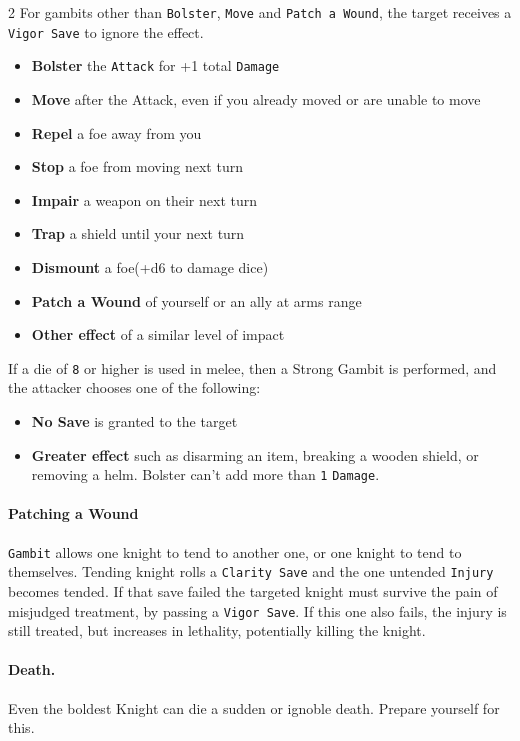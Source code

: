 \documentclass{osr-template/zine}
\begin{document}
\begin{multicols*}{2}
For gambits other than \texttt{Bolster}, \texttt{Move} and \texttt{Patch a Wound}, the target receives a \texttt{Vigor Save} to ignore the effect.

\begin{itemize}[nosep]
    \item \textbf{Bolster} the \texttt{Attack} for +1 total \texttt{Damage}
    \item \textbf{Move} after the Attack, even if you already moved or are unable to move
    \item \textbf{Repel} a foe away from you
    \item \textbf{Stop} a foe from moving next turn
    \item \textbf{Impair} a weapon on their next turn
    \item \textbf{Trap} a shield until your next turn
    \item \textbf{Dismount} a foe(+d6 to damage dice)
    \item \textbf{Patch a Wound} of yourself or an ally at arms range
    \item \textbf{Other effect} of a similar level of impact
\end{itemize}

If a die of \texttt{8} or higher is used in melee, then a Strong Gambit is performed, and the attacker chooses one of the following:

\begin{itemize}[nosep]
    \item \textbf{No Save} is granted to the target
    \item \textbf{Greater effect} such as disarming an item, breaking a wooden shield, or removing a helm. Bolster can't add more than \texttt{1} \texttt{Damage}.
\end{itemize}

\paragraph{Patching a Wound} \texttt{Gambit} allows one knight to tend to another one, or one knight to tend to themselves.
Tending knight rolls a \texttt{Clarity Save} and the one untended \texttt{Injury} becomes tended.
If that save failed the targeted knight must survive the pain of misjudged treatment, by passing a \texttt{Vigor Save}.
If this one also fails, the injury is still treated, but increases in lethality, potentially killing the knight.

\paragraph{Death.} Even the boldest Knight can die a sudden or ignoble death. Prepare yourself for this.

\end{multicols*}
\end{document}
